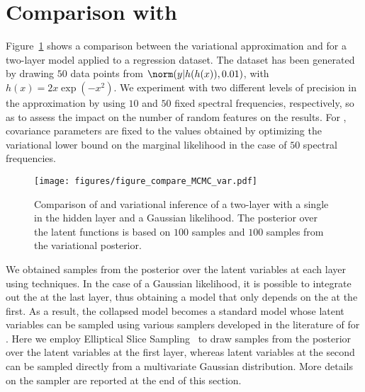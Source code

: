


\section{Comparison with \mcmc}

Figure~\ref{fig:compare_MCMC_variational} shows a comparison between the variational approximation and \mcmc for a two-layer \dgp model applied to a regression dataset.
The dataset has been generated by drawing $50$ data points from $\norm(y | h(h(x)), 0.01)$, with $h(x) = 2x \exp(-x^2)$.
We experiment with two different levels of precision in the \dgp approximation by using $10$ and $50$ fixed spectral frequencies, respectively, so as to assess the impact on the number of random features on the results.
For \mcmc, covariance parameters are fixed to the values obtained by optimizing the variational lower bound on the marginal likelihood in the case of $50$ spectral frequencies.


\begin{figure}[ht]
\centerline{
\texttt{[image: figures/figure\_compare\_MCMC\_var.pdf]}
}
\caption{
Comparison of \mcmc and variational inference of a two-layer \dgp with a single \gp in the hidden layer and a Gaussian likelihood.
The posterior over the latent functions is based on $100$ \mcmc samples and $100$ samples from the variational posterior. 
}
\label{fig:compare_MCMC_variational}
\end{figure}

We obtained samples from the posterior over the latent variables at each layer using \mcmc techniques.
In the case of a Gaussian likelihood, it is possible to integrate out the \gp at the last layer, thus obtaining a model that only depends on the \gp at the first.
As a result, the collapsed \dgp model becomes a standard \gp model whose latent variables can be sampled using various \mcmc samplers developed in the literature of \mcmc for .
Here we employ Elliptical Slice Sampling~\cite{Murray10b} to draw samples from the posterior over the latent variables at the first layer, whereas latent variables at the second can be sampled directly from a multivariate Gaussian distribution.
More details on the \mcmc sampler are reported at the end of this section.

